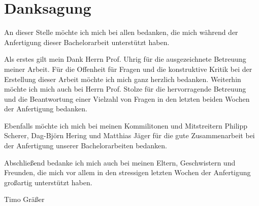 \chapter{Danksagung}

An dieser Stelle möchte ich mich bei allen bedanken, die mich während der Anfertigung dieser Bachelorarbeit unterstützt haben.

Als erstes gilt mein Dank Herrn Prof. Uhrig für die ausgezeichnete Betreuung meiner Arbeit.
Für die Offenheit für Fragen und die konstruktive Kritik bei der Erstellung dieser Arbeit möchte ich mich ganz herzlich bedanken.
Weiterhin möchte ich mich auch bei Herrn Prof. Stolze für die hervorragende Betreuung und die Beantwortung einer Vielzahl
von Fragen in den letzten beiden Wochen der Anfertigung bedanken.

Ebenfalls möchte ich mich bei meinen Kommilitonen und Mitstreitern Philipp Scherer, Dag-Björn Hering und Matthias Jäger für die gute Zusammenarbeit
bei der Anfertigung unserer Bachelorarbeiten bedanken.

Abschließend bedanke ich mich auch bei meinen Eltern, Geschwistern und Freunden, die mich vor allem in den stressigen letzten Wochen
der Anfertigung großartig unterstützt haben.

Timo Gräßer
